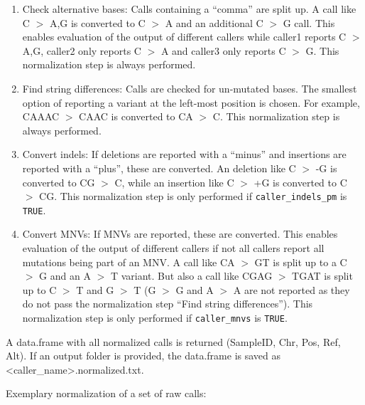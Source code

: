 \documentclass{article}
\begin{document}
\begin{enumerate}
\item Check alternative bases: Calls containing a ``comma'' are split up. A call like C $>$ A,G is converted to C $>$ A and an additional C $>$ G call. This enables evaluation of the output of different callers while caller1 reports C $>$ A,G, caller2 only reports C $>$ A and caller3 only reports C $>$ G. This normalization step is always performed.
\item Find string differences: Calls are checked for un-mutated bases. The smallest option of reporting a variant at the left-most position is chosen. For example, CAAAC $>$ CAAC is converted to CA $>$ C. This normalization step is always performed.
\item Convert indels: If deletions are reported with a ``minus'' and insertions are reported with a ``plus'', these are converted. An deletion like C $>$ -G is converted to CG $>$ C, while an insertion like C $>$ +G is converted to C $>$ CG. This normalization step is only performed if \texttt{caller\_indels\_pm} is \texttt{TRUE}.
\item Convert MNVs: If MNVs are reported, these are converted. This enables evaluation of the output of different callers if not all callers report all mutations being part of an MNV. A call like CA $>$ GT is split up to a C $>$ G and an A $>$ T variant. But also a call like CGAG $>$ TGAT is split up to C $>$ T and G $>$ T (G $>$ G and A $>$ A are not reported as they do not pass the normalization step ``Find string differences''). This normalization step is only performed if \texttt{caller\_mnvs} is \texttt{TRUE}.
\end{enumerate}

A data.frame with all normalized calls is returned (SampleID, Chr, Pos, Ref, Alt). If an output folder is provided, the data.frame is saved as <caller\_name>.normalized.txt.

Exemplary normalization of a set of raw calls:
\end{document}
